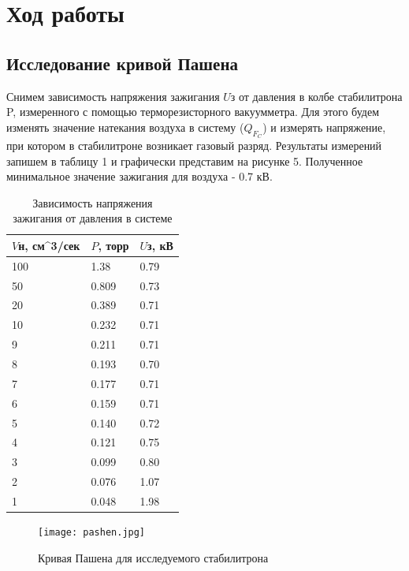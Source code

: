 \documentclass[a4paper]{article}
\begin{document}
\section{Ход работы}

\subsection{Исследование кривой Пашена}

Снимем зависимость напряжения зажигания $U$з от давления в колбе стабилитрона P, измеренного с помощью терморезисторного вакуумметра. Для этого будем изменять значение натекания воздуха в систему ($Q_F_C$) и измерять напряжение, при котором в стабилитроне возникает газовый разряд. Результаты измерений запишем в таблицу 1 и графически представим на рисунке 5. Полученное минимальное значение зажигания для воздуха - 0.7 кВ. 

\begin{table}[H]
    \centering
    \begin{center}
    \caption{Зависимость напряжения зажигания от давления в системе}
        \label{tab:my_label}
    \end{center}
   \begin{tabular}{ |p{2cm}|p{2cm}|p{2cm}|  }

 \hline
 $V$н, см^3/сек & $P$, торр & $U$з, кВ   \\
\hline
\hline

100 & 1.38 & 0.79 \\
\hline
50 & 0.809 & 0.73 \\
\hline
20 & 0.389 & 0.71 \\
\hline
10 & 0.232 & 0.71 \\
\hline
9 & 0.211 & 0.71 \\
\hline
8 & 0.193 & 0.70 \\
\hline
7 & 0.177 & 0.71 \\
\hline
6 & 0.159 & 0.71 \\
\hline
5 & 0.140 & 0.72 \\
\hline
4 & 0.121 & 0.75 \\
\hline
3 & 0.099 & 0.80 \\
\hline
2 & 0.076 & 1.07 \\
\hline
1 & 0.048 & 1.98 \\
\hline
\end{tabular}

\end{table}

\begin{figure}[H]
\begin{center}
\texttt{[image: pashen.jpg]}
\caption{Кривая Пашена для исследуемого стабилитрона}
\label{ris:experimoriginal} %

\end{center}
\end{figure}
\end{document}
